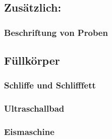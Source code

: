 \subsection{Zusätzlich:}
\subsubsection{Beschriftung von Proben}
\subsection{Füllkörper}
\subsubsection{\hypertarget{Normschliff}{Schliffe} und Schlifffett}
\label{sec:normschliff}
\subsubsection{Ultraschallbad}
\subsubsection{Eismaschine}